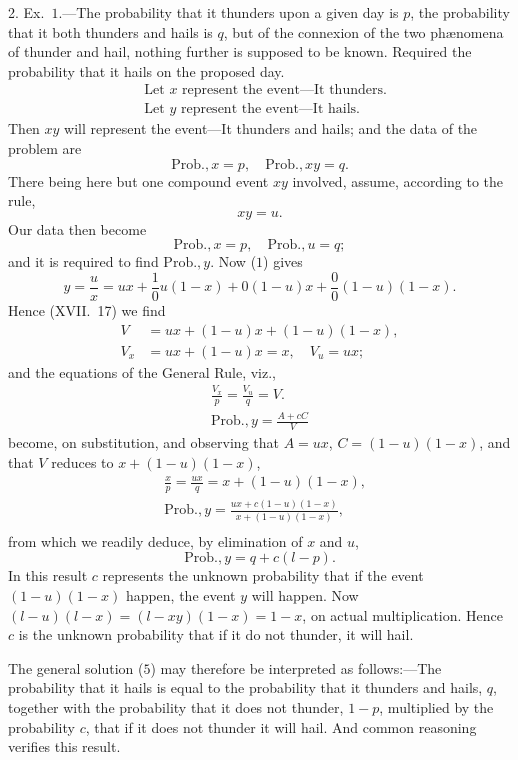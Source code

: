 \documentclass[oneside]{book}
\begin{document}
2. Ex.~$1$.---The probability that it thunders upon a given
day is $p$, the probability that it both thunders and hails is $q$, but
of the connexion of the two ph{\ae}nomena of thunder and hail, nothing
further is supposed to be known. Required the probability
that it hails on the proposed day.
\begin{align*}
&\text{Let $x$ represent the event---It thunders.}\\
&\text{Let $y$ represent the event---It hails.}
\end{align*}
Then $xy$ will represent the event---It thunders and hails; and
the data of the problem are
\[
  \mathrm{Prob. },x=p,\quad\mathrm{Prob. },xy=q.
\]
There being here but one compound event $xy$ involved, assume,
according to the rule,
\[
  xy = u.  \tag{1}
\]
Our data then become
\[
  \mathrm{Prob. },x=p,\quad\mathrm{Prob. },u=q;\tag{2}
\]
and it is required to find $\mathrm{Prob. },y$. Now ($1$) gives
\[
  y = \frac{u}{x}
    = ux + \frac{1}{0}u(1-x) + 0(1-u)x + \frac{0}{0}(1-u)(1-x).
\]
Hence (XVII.~17) we find
\begin{align*}
  V   &= ux + (1-u)x + (1-u)(1-x),   \\
  V_x &= ux + (1-u)x = x, \quad V_u = ux;
\end{align*}
and the equations of the General Rule, viz.,
\begin{gather*}
  \frac{V_x}{p} = \frac{V_u}{q} = V.   \\
  \mathrm{Prob. },y = \frac{A + cC}{V}
\end{gather*}
become, on substitution, and observing that $A = ux$,
$C = (1-u)(1-x)$, and that $V$ reduces to $x + (1-u)(1-x)$,
\begin{align*}
 &\frac{x}{p} = \frac{ux}{q} = x + (1-u)(1-x),  \tag{3}   \\
 &\mathrm{Prob. },y = \frac{ux + c(1-u)(1-x)}{x + (1-u)(1-x)},\tag{4}\\
\end{align*}
from which we readily deduce, by elimination of $x$ and $u$,
\[
  \mathrm{Prob. },y = q + c(l-p).   \tag{5}
\]
In this result $c$ represents the unknown probability that if the
event $(1-u)(1-x)$ happen, the event $y$ will happen. Now
$(l-u)(l-x) = (l-xy)(1-x) = 1-x$, on actual multiplication.
Hence $c$ is the unknown probability that if it do not thunder, it
will hail.

The general solution ($5$) may therefore be interpreted as follows:---The
probability that it hails is equal to the probability
that it thunders and hails, $q$, together with the probability that it
does not thunder, $1-p$, multiplied by the probability $c$, that if it
does not thunder it will hail. And common reasoning verifies
this result.
\end{document}
